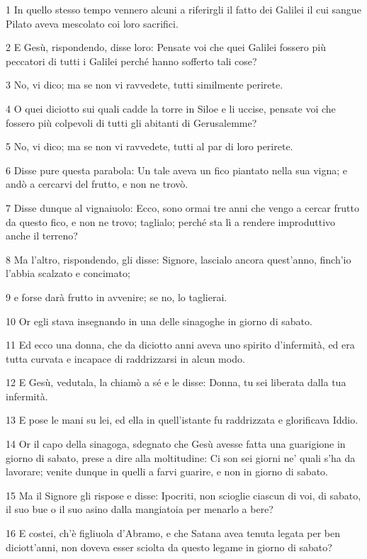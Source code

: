 \par 1 In quello stesso tempo vennero alcuni a riferirgli il fatto dei Galilei il cui sangue Pilato aveva mescolato coi loro sacrifici.
\par 2 E Gesù, rispondendo, disse loro: Pensate voi che quei Galilei fossero più peccatori di tutti i Galilei perché hanno sofferto tali cose?
\par 3 No, vi dico; ma se non vi ravvedete, tutti similmente perirete.
\par 4 O quei diciotto sui quali cadde la torre in Siloe e li uccise, pensate voi che fossero più colpevoli di tutti gli abitanti di Gerusalemme?
\par 5 No, vi dico; ma se non vi ravvedete, tutti al par di loro perirete.
\par 6 Disse pure questa parabola: Un tale aveva un fico piantato nella sua vigna; e andò a cercarvi del frutto, e non ne trovò.
\par 7 Disse dunque al vignaiuolo: Ecco, sono ormai tre anni che vengo a cercar frutto da questo fico, e non ne trovo; taglialo; perché sta lì a rendere improduttivo anche il terreno?
\par 8 Ma l'altro, rispondendo, gli disse: Signore, lascialo ancora quest'anno, finch'io l'abbia scalzato e concimato;
\par 9 e forse darà frutto in avvenire; se no, lo taglierai.
\par 10 Or egli stava insegnando in una delle sinagoghe in giorno di sabato.
\par 11 Ed ecco una donna, che da diciotto anni aveva uno spirito d'infermità, ed era tutta curvata e incapace di raddrizzarsi in alcun modo.
\par 12 E Gesù, vedutala, la chiamò a sé e le disse: Donna, tu sei liberata dalla tua infermità.
\par 13 E pose le mani su lei, ed ella in quell'istante fu raddrizzata e glorificava Iddio.
\par 14 Or il capo della sinagoga, sdegnato che Gesù avesse fatta una guarigione in giorno di sabato, prese a dire alla moltitudine: Ci son sei giorni ne' quali s'ha da lavorare; venite dunque in quelli a farvi guarire, e non in giorno di sabato.
\par 15 Ma il Signore gli rispose e disse: Ipocriti, non scioglie ciascun di voi, di sabato, il suo bue o il suo asino dalla mangiatoia per menarlo a bere?
\par 16 E costei, ch'è figliuola d'Abramo, e che Satana avea tenuta legata per ben diciott'anni, non doveva esser sciolta da questo legame in giorno di sabato?
